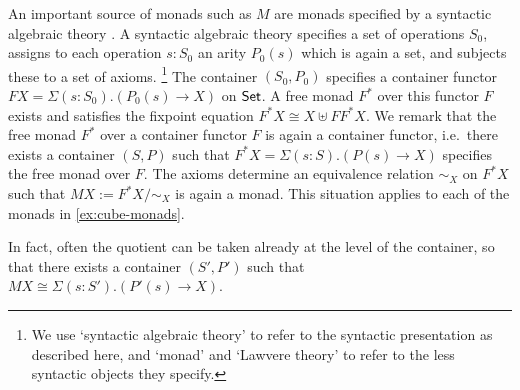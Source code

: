 \documentclass[a4paper]{article}
\begin{document}
\begin{remark}
An important source of monads such as $M$ are monads specified by a syntactic algebraic theory \cite{manes-book,adamek-book,keml-diagrams}.
A syntactic algebraic theory specifies a set of operations $S_0$, assigns to each operation $s : S_0$ an arity $P_0(s)$ which is again a set, and subjects these to a set of axioms.%
\footnote{We use `syntactic algebraic theory' to refer to the syntactic presentation as described here, and `monad' and `Lawvere theory' to refer to the less syntactic objects they specify.
%
}
The container $(S_0, P_0)$ specifies a container functor $FX = \Sigma(s : S_0).(P_0(s) \to X)$ on ${\mathsf{Set}}$.
A free monad $F^*$ over this functor $F$ exists and satisfies the fixpoint equation $F^* X \cong X \uplus F F^* X$.
We remark that the free monad $F^*$ over a container functor $F$ is again a container functor, i.e.\ there exists a container $(S, P)$ such that
$F^* X = \Sigma(s : S).(P(s) \to X)$
specifies the free monad over $F$.
The axioms determine an equivalence relation $\sim_X$ on $F^* X$ such that $M X := F^* X/\sim_X$ is again a monad.
This situation applies to each of the monads in \cref{ex:cube-monads}.

In fact, often the quotient can be taken already at the level of the container, so that there exists a container $(S', P')$ such that $MX \cong \Sigma(s : S').(P'(s) \to X)$.
\end{remark}
\end{document}
